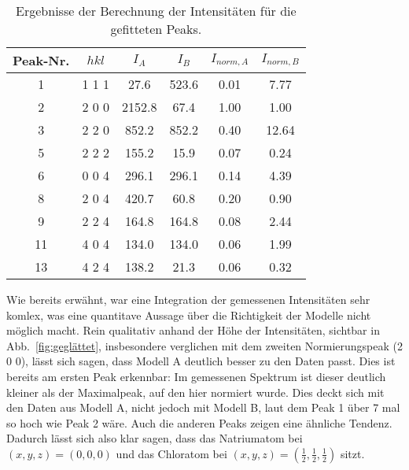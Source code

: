 \begin{table}[h!]
    \centering
    \begin{tabular}{|c|c|c|c|c|c|}
        \hline
        Peak-Nr. & $hkl$&$I_A$ & $I_B$ & $I_{norm,A}$ & $I_{norm,B}$ \\ [0.5ex]
        \hline\hline
       1 & 1 1 1 &27.6 & 523.6 & 0.01 & 7.77 \\
       2 & 2 0 0&2152.8 & 67.4 & 1.00 & 1.00 \\
       3 & 2 2 0&852.2 & 852.2 & 0.40 & 12.64 \\
       5 & 2 2 2&155.2 & 15.9 & 0.07 & 0.24 \\
       6 & 0 0 4&296.1 & 296.1 & 0.14 & 4.39 \\
       8 & 2 0 4&420.7 & 60.8 & 0.20 & 0.90 \\
       9 & 2 2 4&164.8 & 164.8 & 0.08 & 2.44 \\
       11 & 4 0 4&134.0 & 134.0 & 0.06 & 1.99 \\
       13 & 4 2 4&138.2 & 21.3 & 0.06 & 0.32 \\ [1ex]
       \hline
       \end{tabular}
        \caption[short]{Ergebnisse der Berechnung der Intensitäten für die gefitteten Peaks.}
        \label{tab:ergebnisse2}
\end{table}

Wie bereits erwähnt, war eine Integration der gemessenen Intensitäten sehr komlex, was eine quantitave Aussage über die Richtigkeit der Modelle nicht möglich macht. Rein qualitativ anhand der Höhe der Intensitäten, sichtbar in Abb.~\ref{fig:geglättet}, insbesondere verglichen mit dem zweiten Normierungspeak (2 0 0), lässt sich sagen, dass Modell A deutlich besser zu den Daten passt. Dies ist bereits am ersten Peak erkennbar: Im gemessenen Spektrum ist dieser deutlich kleiner als der Maximalpeak, auf den hier normiert wurde. Dies deckt sich mit den Daten aus Modell A, nicht jedoch mit Modell B, laut dem Peak 1 über 7 mal so hoch wie Peak 2 wäre. Auch die anderen Peaks zeigen eine ähnliche Tendenz. Dadurch lässt sich also klar sagen, dass das Natriumatom bei $(x,y,z) = (0,0,0)$ und das Chloratom bei $(x,y,z) = (\frac{1}{2}, \frac{1}{2}, \frac{1}{2})$ sitzt.